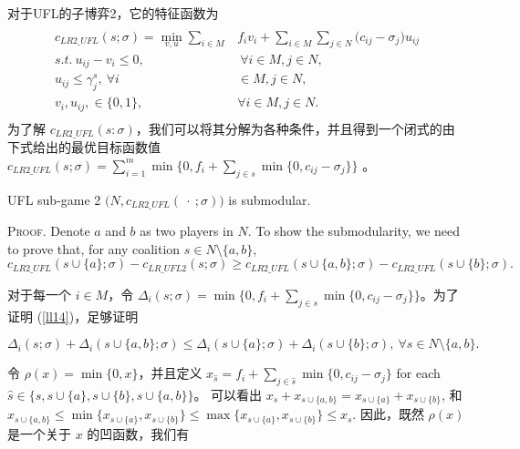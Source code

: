 \documentclass[UTF8]{article}
\begin{document}
\begin{定义}
      对于UFL的子博弈2，它的特征函数为
      \begin{eqnarray}\label{eqn:UFLCFsub2}
      \begin{aligned}
      \begin{split}
      c_{LR2\_UFL}(s;\sigma) = \min_{v,u} \sum_{i \in M} &f_iv_i + \sum_{i \in M} \sum_{j \in N} \big(c_{ij} - \sigma_{j}\big)u_{ij}\\
      s.t.~u_{ij} - v_i \leq 0,&~\forall i \in M, j \in N,\\
      u_{ij} \leq \gamma_j^s,~\forall i& \in M, j \in N,\\
       v_i,u_{ij}, \in \{0,1\},~&\forall i \in M, j \in N.
      \end{split}
      \end{aligned}
      \end{eqnarray}
      为了解 $c_{LR2\_UFL}(s:\sigma)$，我们可以将其分解为各种条件，并且得到一个闭式的由下式给出的最优目标函数值 $c_{LR2\_UFL}(s;\sigma) = \sum_{i=1}^m \min \big\{0,f_i+\sum_{j \in s} \min \{0,c_{ij}-\sigma_j\}\big\}$ 。

      \begin{lemma}\label{lemma:UFLSubmodular}
      UFL sub-game 2 $\big(N,c_{LR2\_UFL}(\ \cdot \ ;\sigma)\big)$ is submodular.
      \end{lemma}
      {\scshape Proof.}
      Denote $a$ and $b$ as two players in $N$. To show the submodularity, we need to prove that, for any coalition $s \in N\setminus \big\{a,b\big\}$,
      \begin{equation}\label{ll14}
      c_{LR2\_UFL}(s \cup \{a\}; \sigma) - c_{LR\_UFL2}(s;\sigma) \geq c_{LR2\_UFL}(s \cup \big\{a,b\big\};\sigma) - c_{LR2\_UFL}(s \cup \{b\};\sigma).
      \end{equation}

      对于每一个 $i\in M$，令 $\Delta_i(s;\sigma) = \min \{0, f_i + \sum_{j \in s} \min \{0, c_{ij} - \sigma_j\} \}$。为了证明 (\ref{ll14})，足够证明

      \begin{equation}\label{eqn:submodularufl}
      \Delta_i(s;\sigma) + \Delta_i(s \cup \{a,b\};\sigma) \leq \Delta_i(s \cup \{a\};\sigma) + \Delta_i(s \cup \{b\};\sigma), ~\forall s \in N\setminus\big\{a,b\big\}. \end{equation}

      令 $\rho(x)=\min\{0,x\}$，并且定义 $x_{\hat{s}}= f_i + \sum_{j \in \hat{s}} \min \{0, c_{ij} - \sigma_j\}$ for each $\hat{s}\in \{s,s\cup\{a\},s\cup\{b\},s\cup\{a,b\}\}$。
      可以看出 $x_s+x_{s\cup\{a,b\}} = x_{s\cup \{a\}}+x_{s\cup\{b\}}$, 和 $x_{s\cup\{a,b\}}\leq \min\{x_{s\cup \{a\}},x_{s\cup\{b\}}\}\leq  \max\{x_{s\cup \{a\}},x_{s\cup\{b\}}\} \leq x_{s}$.
      因此，既然 $\rho(x)$ 是一个关于 $x$ 的凹函数，我们有


\end{定义}
\end{document}

